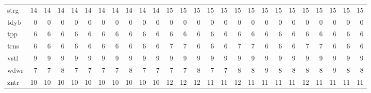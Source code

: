 \begin{center}
\begin{tabular}{lrrrrrrrrrrrrrrrrrrrrrrrrr}
strg & 14 & 14 & 14 & 14 & 14 & 14 & 14 & 14 & 14 & 14 & 15 & 15 & 15 & 15 & 15 & 15 & 15 & 15 & 15 & 15 & 15 & 15 & 15 & 15 & 15\\
tdyb & 0 & 0 & 0 & 0 & 0 & 0 & 0 & 0 & 0 & 0 & 0 & 0 & 0 & 0 & 0 & 0 & 0 & 0 & 0 & 0 & 0 & 0 & 0 & 0 & 0\\
tpp & 6 & 6 & 6 & 6 & 6 & 6 & 6 & 6 & 6 & 6 & 6 & 6 & 6 & 6 & 6 & 6 & 6 & 6 & 6 & 6 & 6 & 6 & 6 & 6 & 6\\
trns & 6 & 6 & 6 & 6 & 6 & 6 & 6 & 6 & 6 & 6 & 7 & 7 & 6 & 6 & 6 & 7 & 7 & 6 & 6 & 6 & 7 & 7 & 6 & 6 & 6\\
vstl & 9 & 9 & 9 & 9 & 9 & 9 & 9 & 9 & 9 & 9 & 9 & 9 & 9 & 9 & 9 & 9 & 9 & 9 & 9 & 9 & 9 & 9 & 9 & 9 & 9\\
wdwr & 7 & 7 & 8 & 7 & 7 & 7 & 7 & 8 & 7 & 7 & 7 & 7 & 8 & 7 & 7 & 8 & 8 & 9 & 8 & 8 & 8 & 8 & 9 & 8 & 8\\
zntr & 10 & 10 & 10 & 10 & 10 & 10 & 10 & 10 & 10 & 10 & 12 & 12 & 12 & 11 & 11 & 12 & 11 & 11 & 11 & 11 & 12 & 11 & 11 & 11 & 11\\
\end{tabular}
\end{center}
